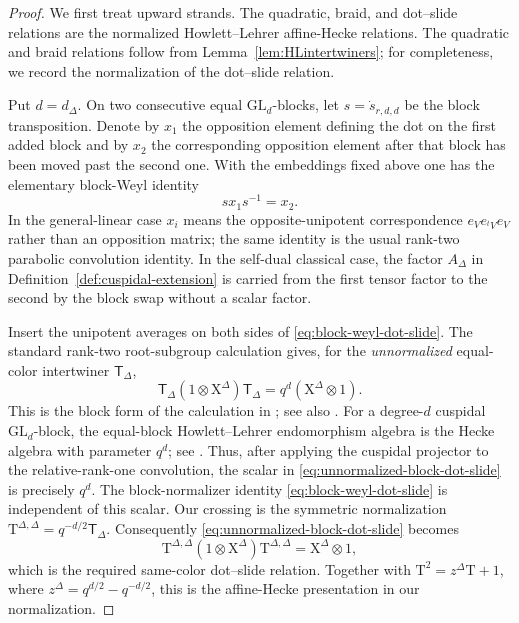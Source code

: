 \documentclass[12pt]{amsart}
\numberwithin{itemcounter}{subsection}
\theoremstyle{plain}
\theoremstyle{definition}
\theoremstyle{remark}
\numberwithin{equation}{section}
\def\GL{\mathrm{GL}}
\begin{document}
\begin{proof}
We first treat upward strands.  The quadratic, braid, and dot--slide
relations are the normalized Howlett--Lehrer affine-Hecke relations.  The
quadratic and braid relations follow from Lemma~\ref{lem:HLintertwiners};
for completeness, we record the normalization of the dot--slide relation.

Put $d=d_\Delta$.  On two consecutive equal
$\GL_d$-blocks, let $s=\dot s_{r,d,d}$ be the block transposition.  Denote by
$x_1$ the opposition element defining the dot on the first added block and by
$x_2$ the corresponding opposition element after that block has been moved
past the second one.  With the embeddings fixed above one has the elementary
block-Weyl identity
\begin{equation}\label{eq:block-weyl-dot-slide}
 s x_1s^{-1}=x_2.
\end{equation}
In the general-linear case $x_i$ means the opposite-unipotent correspondence
$e_Ve_{{}^tV}e_V$ rather than an opposition matrix; the same identity is the
usual rank-two parabolic convolution identity.  In the self-dual classical
case, the factor $A_\Delta$ in Definition~\ref{def:cuspidal-extension} is
carried from the first tensor factor to the second by the block swap without
a scalar factor.

Insert the unipotent averages on both sides of
\eqref{eq:block-weyl-dot-slide}.  The standard rank-two root-subgroup
calculation gives, for the \emph{unnormalized} equal-color intertwiner
$\mathsf T_\Delta$,
\begin{equation}\label{eq:unnormalized-block-dot-slide}
 \mathsf T_\Delta(1\otimes \mathrm{X}^\Delta)\mathsf T_\Delta
   =q^d(\mathrm{X}^\Delta\otimes1).
\end{equation}
This is the block form of the calculation in
\cite[Proposition~4.2(c),(f)]{LLZ}; see also
\cite[Proposition~2.9]{LSZ25}.  For a degree-$d$ cuspidal
$\GL_d$-block, the equal-block Howlett--Lehrer endomorphism algebra is the
Hecke algebra with parameter $q^d$; see \cite[\S2.5]{BDK01}.  Thus, after
applying the cuspidal projector to the relative-rank-one convolution, the
scalar in \eqref{eq:unnormalized-block-dot-slide} is precisely
$q^d$.  The block-normalizer identity
\eqref{eq:block-weyl-dot-slide} is independent of this scalar.  Our crossing
is the symmetric normalization
$\mathrm{T}^{\Delta,\Delta}=q^{-d/2}\mathsf T_\Delta$.
Consequently \eqref{eq:unnormalized-block-dot-slide} becomes
\[
 \mathrm{T}^{\Delta,\Delta}(1\otimes \mathrm{X}^\Delta)\mathrm{T}^{\Delta,\Delta}
   =\mathrm{X}^\Delta\otimes1,
\]
which is the required same-color dot--slide relation.  Together with
$\mathrm{T}^2=z^\Delta\mathrm{T}+1$, where
$z^\Delta=q^{d/2}-q^{-d/2}$, this is the affine-Hecke
presentation in our normalization.


\end{proof}
\end{document}
